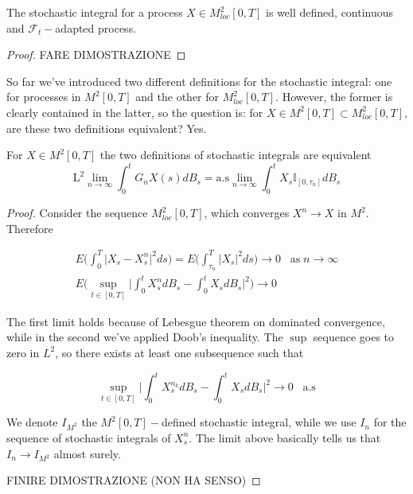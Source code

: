 \begin{theorem}
    The stochastic integral for a process $X \in M^2_{loc}[0,T]$ is well defined, continuous and $\mathcal{F}_t-$adapted process. 
\end{theorem}
\begin{proof}
    FARE DIMOSTRAZIONE
\end{proof}

So far we've introduced two different definitions for the stochastic integral: one for processes in $M^2[0,T]$ and the other for $M^2_{loc}[0,T]$. However, the former is clearly contained in the latter, so the question is: for $X \in M^2[0,T] \subset M^2_{loc}[0,T]$, are these two definitions equivalent? Yes.

\begin{proposition}
    For $X \in M^2[0,T]$ the two definitions of stochastic integrals are equivalent
    \begin{equation*}
        \text{L}^2 \lim_{n \to \infty} \int_0^t G_n X(s) dB_s = \text{a.s} \lim_{n \to \infty} \int_0^t X_s \mathbb{I}_{[0,\tau_n]} dB_s 
    \end{equation*}
\end{proposition}
\begin{proof}
Consider the sequence $M^2_{loc}[0,T]$, which converges $X^n \to X$ in $M^2$. Therefore

\begin{gather*}
    E\Bigg( \int_0^T \big\vert X_s - X^{n}_s \big\vert^2 ds \Bigg) = E\Bigg( \int_{\tau_n}^T \big\vert X_s \big\vert^2 ds \Bigg) \to 0 \;\;\; \text{as} \; n \to \infty \\
    E\Bigg( \sup_{t \in [0,T]} \Bigg\vert \int_0^t X_s^n dB_s - \int_0^t X_s dB_s \Bigg\vert^2 \Bigg) \to 0
\end{gather*}

The first limit holds because of Lebesgue theorem on dominated convergence, while in the second we've applied Doob's inequality. The $\sup$ sequence goes to zero in $L^2$, so there exists at least one subsequence such that

\begin{equation*}
    \sup_{t \in [0,T]} \Bigg\vert \int_0^t X_s^{n_k} dB_s - \int_0^t X_s dB_s \Bigg\vert^2 \to 0 \;\;\; \text{a.s}
\end{equation*}

We denote $I_{M^2}$ the $M^2[0,T]-$defined stochastic integral, while we use $I_n$ for the sequence of stochastic integrals of $X^n_s$. The limit above basically tells us that $I_n \to I_{M^2}$ almost surely. 

FINIRE DIMOSTRAZIONE (NON HA SENSO)
\end{proof}

